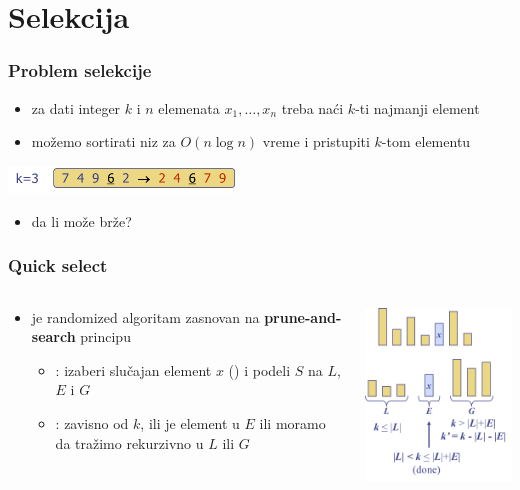 \documentclass[compress,aspectratio=169]{beamer}
\begin{document}
\section[Selekcija]{Selekcija}

\begin{frame}
  \frametitle{Problem selekcije}
  \begin{itemize}
    \item za dati integer $k$ i $n$ elemenata $x_1, \ldots, x_n$ treba naći $k$-ti najmanji element
    \item možemo sortirati niz za $O(n\log n)$ vreme i pristupiti $k$-tom elementu
  \end{itemize}
  \begin{center}
    \includegraphics[width=6cm]{asp-12-pic35.png}
  \end{center}
  \begin{itemize}
    \item da li može brže?
  \end{itemize}
\end{frame}

\begin{frame}
  \frametitle{Quick select}
  \begin{columns}
    \begin{column}[t]{6cm}
      \begin{itemize}
        \item {} je randomized algoritam zasnovan na \textbf{prune-and-search} principu
        \begin{itemize}
          \item {}: izaberi slučajan element $x$ () i podeli $S$ na $L$, $E$ i $G$
          \item {}: zavisno od $k$, ili je element u $E$ ili moramo da tražimo rekurzivno u $L$ ili $G$
        \end{itemize}
      \end{itemize}
    \end{column}
    \begin{column}[t]{6cm}
      \begin{center}
        \includegraphics[width=6cm]{asp-12-pic36.png}
      \end{center}
    \end{column}
  \end{columns}
\end{frame}
\end{document}
